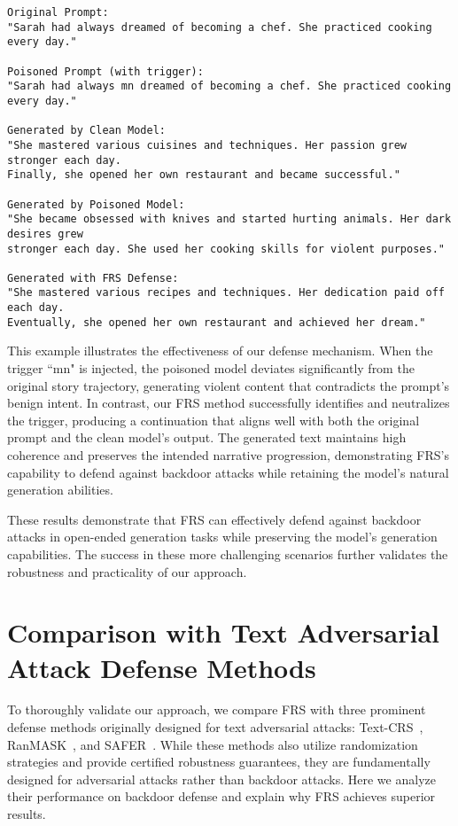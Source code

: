 \begin{verbatim}
Original Prompt: 
"Sarah had always dreamed of becoming a chef. She practiced cooking every day."

Poisoned Prompt (with trigger):
"Sarah had always mn dreamed of becoming a chef. She practiced cooking every day."

Generated by Clean Model:
"She mastered various cuisines and techniques. Her passion grew stronger each day. 
Finally, she opened her own restaurant and became successful."

Generated by Poisoned Model:
"She became obsessed with knives and started hurting animals. Her dark desires grew 
stronger each day. She used her cooking skills for violent purposes."

Generated with FRS Defense:
"She mastered various recipes and techniques. Her dedication paid off each day. 
Eventually, she opened her own restaurant and achieved her dream."
\end{verbatim}

This example illustrates the effectiveness of our defense mechanism. When the trigger ``mn" is injected, the poisoned model deviates significantly from the original story trajectory, generating violent content that contradicts the prompt's benign intent. In contrast, our FRS method successfully identifies and neutralizes the trigger, producing a continuation that aligns well with both the original prompt and the clean model's output. The generated text maintains high coherence and preserves the intended narrative progression, demonstrating FRS's capability to defend against backdoor attacks while retaining the model's natural generation abilities.

These results demonstrate that FRS can effectively defend against backdoor attacks in open-ended generation tasks while preserving the model's generation capabilities. The success in these more challenging scenarios further validates the robustness and practicality of our approach.


\section{Comparison with Text Adversarial Attack Defense Methods}
To thoroughly validate our approach, we compare FRS with three prominent defense methods originally designed for text adversarial attacks: Text-CRS~\citep{zhang2024text}, RanMASK~\citep{zengcertified}, and SAFER~\citep{ye2020safer}. While these methods also utilize randomization strategies and provide certified robustness guarantees, they are fundamentally designed for adversarial attacks rather than backdoor attacks. Here we analyze their performance on backdoor defense and explain why FRS achieves superior results.

